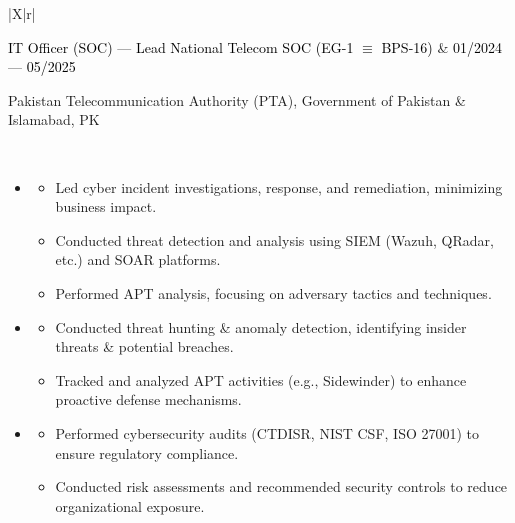 \documentclass{resume}
\begin{document}
\begin{tabularx}{\linewidth}{|X|r|}
    \hline
    
    \textcolor{black}{IT Officer (SOC) --- Lead National Telecom SOC \space (EG-1 $\equiv$ BPS-16)} & 
    \textcolor{black}{01/2024 --- 05/2025} \\
    \hline
    
    Pakistan Telecommunication Authority (PTA), Government of Pakistan & Islamabad, PK \\
    \hline
    
     \\
    \hline
\end{tabularx}
\begin{itemize}
\item {}
\begin{itemize}
\item Led cyber incident investigations, response, and remediation, minimizing business impact.  
\item Conducted threat detection and analysis using SIEM (Wazuh, QRadar, etc.) and SOAR platforms.  
\item Performed APT analysis, focusing on adversary tactics and techniques.   
\end{itemize}
\end{itemize}
\begin{itemize}
\item {}
\begin{itemize}
\item Conducted threat hunting \& anomaly detection, identifying insider threats \& potential breaches.  
\item Tracked and analyzed APT activities (e.g., Sidewinder) to enhance proactive defense mechanisms.    
\end{itemize}
\end{itemize}
\begin{itemize}
\item {}
\begin{itemize}
\item Performed cybersecurity audits (CTDISR, NIST CSF, ISO 27001) to ensure regulatory compliance.  
\item Conducted risk assessments and recommended security controls to reduce organizational exposure.  
\end{itemize}
\end{itemize}
\end{document}
